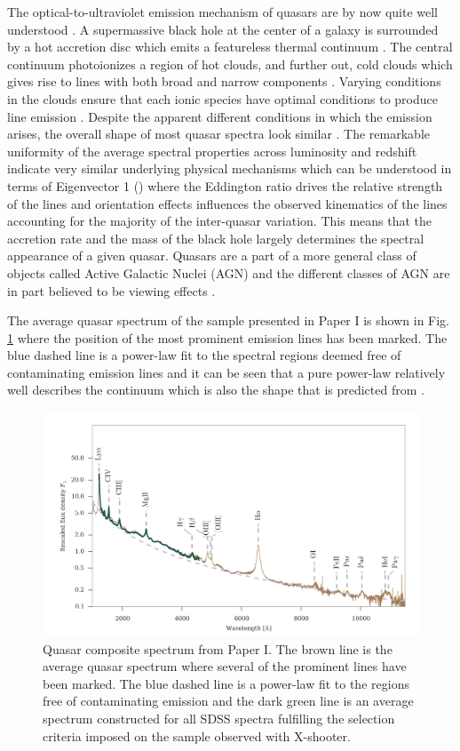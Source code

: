 The optical-to-ultraviolet emission mechanism of quasars are by now quite well
understood \citep{Elvis1994}. A supermassive black hole at the center of a
galaxy is surrounded by a hot accretion disc which emits a featureless thermal
continuum \citep{Shakura1973, Pereyra2006}. The central continuum photoionizes a
region of hot clouds, and further out, cold clouds which gives rise to lines
with both broad and narrow components \citep{Elvis2001}.  Varying conditions in
the clouds ensure that each ionic species have optimal conditions to produce
line emission \citep{Baldwin1995}. Despite the apparent different conditions in
which the emission arises, the overall shape of most quasar spectra look similar
\citep{Dietrich2002}. The remarkable uniformity of the average spectral
properties across luminosity and redshift indicate very similar underlying
physical mechanisms which can be understood in terms of Eigenvector 1
(\citep{Boroson1992, Francis1992}) where the Eddington ratio drives the relative
strength of the lines and orientation effects influences the observed kinematics
of the lines \citep{Shen2014a} accounting for the majority of the inter-quasar
variation. This means that the accretion rate and the mass of the black hole
largely determines the spectral appearance of a given quasar. Quasars are a part
of a more general class of objects called Active Galactic Nuclei (AGN) and the
different classes of AGN are in part believed to be viewing effects
\citep{Elvis2001}.


The average quasar spectrum of the sample presented in Paper I is shown in Fig.
\ref{fig:intro:qsospec} where the position of the most prominent emission lines
has been marked. The blue dashed line is a power-law fit to the spectral regions
deemed free of contaminating emission lines and it can be seen that a pure
power-law relatively well describes the continuum which is also the shape that
is predicted from \citep{Pereyra2006}.

\begin{figure}[htb]
	\includegraphics[width=\textwidth]{gfx/qsospec}
	\caption{Quasar composite spectrum from Paper I. The brown line is the average
quasar spectrum where several of the prominent lines have been marked. The blue
dashed line is a power-law fit to the regions free of contaminating emission and
 the dark green line is an average spectrum constructed for all SDSS spectra
fulfilling the selection criteria imposed on the sample observed with
X-shooter.}
	\label{fig:intro:qsospec}
\end{figure}


